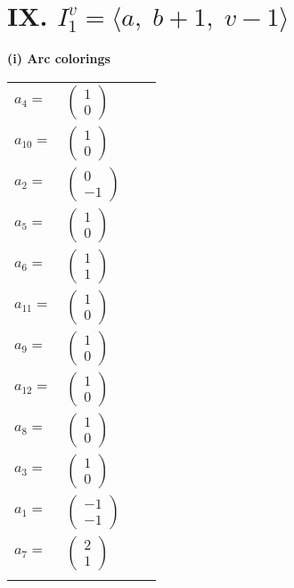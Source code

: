 \documentclass[1p]{elsarticle_modified}
\theoremstyle{definition}
\begin{document}
\centering \section*{IX. $I^v_{1}= \langle a,\;b+1,\;v-1 \rangle$}
\flushleft \textbf{(i) Arc colorings}\\
\begin{tabular}{m{7pt} m{180pt} m{7pt} m{180pt} }
\flushright $a_{4}=$&$\begin{pmatrix}1\\0\end{pmatrix}$ \\
\flushright $a_{10}=$&$\begin{pmatrix}1\\0\end{pmatrix}$ \\
\flushright $a_{2}=$&$\begin{pmatrix}0\\-1\end{pmatrix}$ \\
\flushright $a_{5}=$&$\begin{pmatrix}1\\0\end{pmatrix}$ \\
\flushright $a_{6}=$&$\begin{pmatrix}1\\1\end{pmatrix}$ \\
\flushright $a_{11}=$&$\begin{pmatrix}1\\0\end{pmatrix}$ \\
\flushright $a_{9}=$&$\begin{pmatrix}1\\0\end{pmatrix}$ \\
\flushright $a_{12}=$&$\begin{pmatrix}1\\0\end{pmatrix}$ \\
\flushright $a_{8}=$&$\begin{pmatrix}1\\0\end{pmatrix}$ \\
\flushright $a_{3}=$&$\begin{pmatrix}1\\0\end{pmatrix}$ \\
\flushright $a_{1}=$&$\begin{pmatrix}-1\\-1\end{pmatrix}$ \\
\flushright $a_{7}=$&$\begin{pmatrix}2\\1\end{pmatrix}$\\&\end{tabular}
\end{document}

